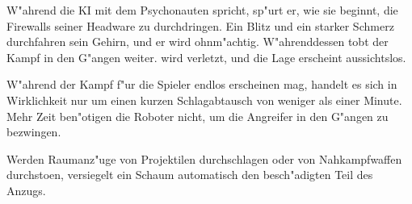 W"ahrend die KI mit dem Psychonauten spricht, sp"urt er, wie sie beginnt, die Firewalls seiner Headware zu durchdringen. Ein Blitz und ein starker Schmerz durchfahren sein Gehirn, und er wird ohnm"achtig. W"ahrenddessen tobt der Kampf in den G"angen weiter. \ml{} wird verletzt, und die Lage erscheint aussichtslos.

\begin{remarks}
    W"ahrend der Kampf f"ur die Spieler endlos erscheinen mag, handelt es sich in Wirklichkeit nur um einen kurzen Schlagabtausch von weniger als einer Minute. Mehr Zeit ben"otigen die Roboter nicht, um die Angreifer in den G"angen zu bezwingen.

    Werden Raumanz"uge von Projektilen durchschlagen oder von Nahkampfwaffen durchsto\3en, versiegelt ein Schaum automatisch den besch"adigten Teil des Anzugs.
\end{remarks}    
